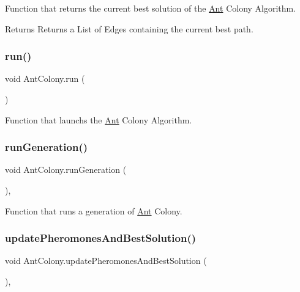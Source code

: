 Function that returns the current best solution of the \hyperlink{classAnt}{Ant} Colony Algorithm. 

\begin{DoxyReturn}{Returns}
Returns a List of Edges containing the current best path.
\end{DoxyReturn}
\mbox{\label{classAntColony_a479ced179ce876bae6dfdbcc3f7e03d4}} 
\subsubsection{\texorpdfstring{run()}{run()}}
{\footnotesize\ttfamily void Ant\+Colony.\+run (\begin{DoxyParamCaption}{ }\end{DoxyParamCaption})\hspace{0.3cm}{\ttfamily [inline]}}



Function that launchs the \hyperlink{classAnt}{Ant} Colony Algorithm. 

\mbox{\label{classAntColony_a4b04a4d6dea0cf1edb4c08bf9fb8a76a}} 
\subsubsection{\texorpdfstring{run\+Generation()}{runGeneration()}}
{\footnotesize\ttfamily void Ant\+Colony.\+run\+Generation (\begin{DoxyParamCaption}{ }\end{DoxyParamCaption})\hspace{0.3cm}{\ttfamily [inline]}, {\ttfamily [private]}}



Function that runs a generation of \hyperlink{classAnt}{Ant} Colony. 

\mbox{\label{classAntColony_a488ce21997f558be3064f0a90fcc0dcb}} 
\subsubsection{\texorpdfstring{update\+Pheromones\+And\+Best\+Solution()}{updatePheromonesAndBestSolution()}}
{\footnotesize\ttfamily void Ant\+Colony.\+update\+Pheromones\+And\+Best\+Solution (\begin{DoxyParamCaption}{ }\end{DoxyParamCaption})\hspace{0.3cm}{\ttfamily [inline]}, {\ttfamily [private]}}



